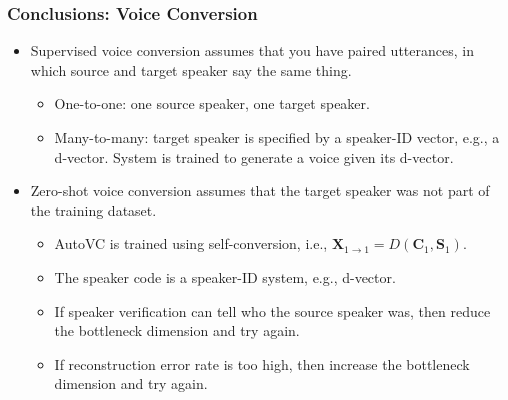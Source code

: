 \documentclass{beamer}
\begin{document}
\begin{frame}
  \frametitle{Conclusions: Voice Conversion}

  \begin{itemize}
  \item Supervised voice conversion assumes that you have paired
    utterances, in which source and target speaker say the same thing.
    \begin{itemize}
    \item One-to-one: one source speaker, one target speaker.
    \item Many-to-many: target speaker is specified by a speaker-ID
      vector, e.g., a d-vector.  System is trained to generate a voice
      given its d-vector.
    \end{itemize}
  \item Zero-shot voice conversion assumes that the target speaker was
    not part of the training dataset.
    \begin{itemize}
    \item AutoVC is trained using self-conversion, i.e.,
      $\bm{X}_{1\rightarrow{1}}=D(\bm{C}_1,\bm{S}_1)$.
    \item The speaker code is a speaker-ID system, e.g., d-vector.
    \item If speaker verification can tell who the source speaker was, then reduce the
      bottleneck dimension and try again.
    \item If reconstruction error rate is too high, then increase the
      bottleneck dimension and try again.
    \end{itemize}
  \end{itemize}
\end{frame}
\end{document}
